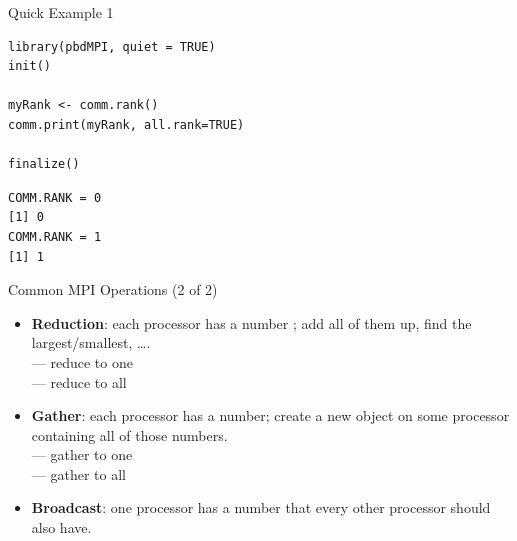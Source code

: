 \begin{frame}[fragile]
  \begin{exampleblock}{Quick Example 1}
   \begin{center}
\begin{lstlisting}[title=Rank Query]
library(pbdMPI, quiet = TRUE)
init()

myRank <- comm.rank()
comm.print(myRank, all.rank=TRUE)

finalize()
\end{lstlisting}

\begin{lstlisting}[title=Sample Output]
COMM.RANK = 0
[1] 0
COMM.RANK = 1
[1] 1
\end{lstlisting}

    \end{center}
  \end{exampleblock}
\end{frame}

\begin{frame}[shrink]
  \begin{block}{Common MPI Operations (2 of 2)}\pause
    \begin{itemize}
      \item \textbf{Reduction}:  each processor has a number ; add all of them up, find the largest/smallest, \dots .\\
       --- reduce to one\\
       --- reduce to all\\[.4cm]
      \item \textbf{Gather}: each processor has a number; create a new object on some processor containing all of those numbers.\\
       --- gather to one\\
       --- gather to all\\[.4cm]
      \item \textbf{Broadcast}: one processor has a number  that every other processor should also have.\\
      \\[.4cm]
    \end{itemize}
  \end{block}
\end{frame}

